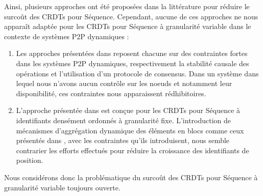 Ainsi, plusieurs approches ont été proposées dans la littérature pour réduire le surcoût des \acp{CRDT} pour Séquence.
Cependant, aucune de ces approches ne nous apparaît adaptée pour les \acp{CRDT} pour Séquence à granularité variable dans le contexte de systèmes \ac{P2P} dynamiques :

\begin{enumerate}
    \item Les approches présentées dans \cite{ROH2011354,letia:hal-01248270,zawirski:hal-01248197} reposent chacune sur des contraintes fortes dans les systèmes \ac{P2P} dynamiques, \ie respectivement la stabilité causale des opérations et l'utilisation d'un protocole de consensus.
        Dans un système dans lequel nous n'avons aucun contrôle sur les noeuds et notamment leur disponibilité, ces contraintes nous apparaissent rédhibitoires.
    \item L'approche présentée dans \cite{lseq2013,lseq2017} est conçue pour les \acp{CRDT} pour Séquence à identifiants densément ordonnés à granularité fixe.
        L'introduction de mécanismes d'aggrégation dynamique des éléments en blocs comme ceux présentés dans \cite{2013-logootsplit,briot:hal-01343941}, avec les contraintes qu'ils introduisent, nous semble contrarier les efforts effectués pour réduire la croissance des identifiants de position.
\end{enumerate}

Nous considérons donc la problématique du surcoût des \acp{CRDT} pour Séquence à granularité variable toujours ouverte.
